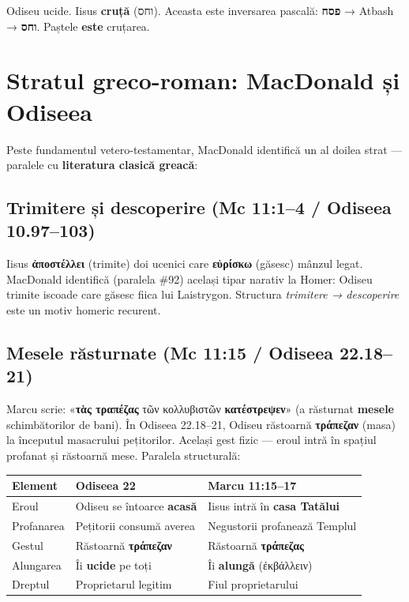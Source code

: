 \documentclass[12pt,a4paper,twoside,openany]{book}
\begin{document}
Odiseu ucide. Iisus \textbf{cruță} (וחס). Aceasta este inversarea pascală: \textbf{פסח} → Atbash → \textbf{וחס}. Paștele \textbf{este} cruțarea.

\section{Stratul greco-roman: MacDonald și Odiseea}

Peste fundamentul vetero-testamentar, MacDonald identifică un al doilea strat — paralele cu \textbf{literatura clasică greacă}:

\subsection{Trimitere și descoperire (Mc 11:1--4 / Odiseea 10.97--103)}

Iisus \textbf{ἀποστέλλει} (trimite) doi ucenici care \textbf{εὑρίσκω} (găsesc) mânzul legat. MacDonald identifică (paralela \#92) același tipar narativ la Homer: Odiseu trimite iscoade care găsesc fiica lui Laistrygon. Structura \textit{trimitere → descoperire} este un motiv homeric recurent.

\subsection{Mesele răsturnate (Mc 11:15 / Odiseea 22.18--21)}

Marcu scrie: «\textbf{τὰς τραπέζας} τῶν κολλυβιστῶν \textbf{κατέστρεψεν}» (a răsturnat \textbf{mesele} schimbătorilor de bani). În Odiseea 22.18--21, Odiseu răstoarnă \textbf{τράπεζαν} (masa) la începutul masacrului pețitorilor. Același gest fizic — eroul intră în spațiul profanat și răstoarnă mese. Paralela structurală:

\begin{center}
\small
\begin{tabularx}{\textwidth}{L{3cm}L{5.5cm}X}
\toprule
{}
\textbf{Element} & \textbf{Odiseea 22} & \textbf{Marcu 11:15--17} \\
\midrule
Eroul & Odiseu se întoarce \textbf{acasă} & Iisus intră în \textbf{casa Tatălui} \\
Profanarea & Pețitorii consumă averea & Negustorii profanează Templul \\
Gestul & Răstoarnă \textbf{τράπεζαν} & Răstoarnă \textbf{τράπεζας} \\
Alungarea & Îi \textbf{ucide} pe toți & Îi \textbf{alungă} (ἐκβάλλειν) \\
Dreptul & Proprietarul legitim & Fiul proprietarului \\
\bottomrule
\end{tabularx}
\end{center}
\end{document}
